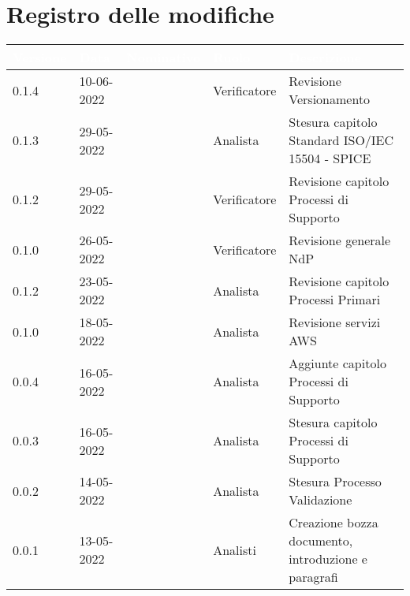 \section*{Registro delle modifiche}
{

\newlength{\freewidth}
\setlength{\freewidth}{\dimexpr\textwidth-10\tabcolsep}
\renewcommand{\arraystretch}{1.5}
\centering
\setlength{\aboverulesep}{0pt}
\setlength{\belowrulesep}{0pt}
\begin{longtable}{C{.13\freewidth} C{.15\freewidth} C{.26\freewidth} C{.18\freewidth} C{.282379\freewidth}}
	\toprule
{}
\textcolor{white}{\textbf{Versione}}&
\textcolor{white}{\textbf{Data}}&
\textcolor{white}{\textbf{Nominativo}}&
\textcolor{white}{\textbf{Ruolo}}&
\textcolor{white}{\textbf{Descrizione}}\\	
\toprule
\endhead

0.1.4 & 10-06-2022 & \marcov{} & Verificatore & Revisione Versionamento\\
0.1.3 & 29-05-2022 & \matteo{} & Analista & Stesura capitolo Standard ISO/IEC 15504 - SPICE\\
0.1.2 & 29-05-2022 & \matteo{} & Verificatore & Revisione capitolo Processi di Supporto\\
0.1.0 & 26-05-2022 & \marcov{} & Verificatore & Revisione generale NdP\\
0.1.2 & 23-05-2022 & \matteo{} & Analista & Revisione capitolo Processi Primari\\
0.1.0 & 18-05-2022 & \marcov{} & Analista & Revisione servizi AWS\\
0.0.4 & 16-05-2022 & \matteo{} & Analista & Aggiunte capitolo Processi di Supporto\\
0.0.3 & 16-05-2022 & \marcov{} & Analista & Stesura capitolo Processi di Supporto\\		
0.0.2 & 14-05-2022 & \matteo{} & Analista & Stesura Processo Validazione\\
0.0.1 & 13-05-2022 & \teamname{} & Analisti & Creazione bozza documento, introduzione e paragrafi\\	
\bottomrule
\end{longtable}
}
